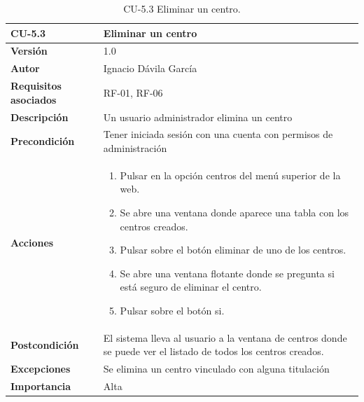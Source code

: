 \begin{table}[p]
	\centering
	\begin{tabularx}{\linewidth}{ p{} p{} }
		\toprule
		\textbf{CU-5.3}    & \textbf{Eliminar un centro}\\
		\toprule
		\textbf{Versión}              & 1.0    \\
		\textbf{Autor}                & Ignacio Dávila García \\
		\textbf{Requisitos asociados} & RF-01, RF-06 \\
		\textbf{Descripción}          & Un usuario administrador elimina un centro \\
		\textbf{Precondición}         & Tener iniciada sesión con una cuenta con permisos de administración \\
		\textbf{Acciones}             &
		\begin{enumerate}
			\def\labelenumi{\arabic{enumi}.}
			\tightlist
			\item Pulsar en la opción centros del menú superior de la web.
			\item Se abre una ventana donde aparece una tabla con los centros creados.
			\item Pulsar sobre el botón eliminar de uno de los centros.
			\item Se abre una ventana flotante donde se pregunta si está seguro de eliminar el centro.
			\item Pulsar sobre el botón si.
		\end{enumerate}\\
		\textbf{Postcondición}        & El sistema lleva al usuario a la ventana de centros donde se puede ver el listado de todos los centros creados. \\
		\textbf{Excepciones}          & Se elimina un centro vinculado con alguna titulación \\
		\textbf{Importancia}          & Alta \\
		\bottomrule
	\end{tabularx}
	\caption{CU-5.3 Eliminar un centro.}
\end{table}


